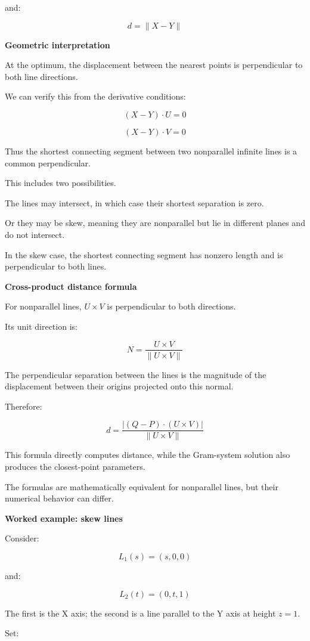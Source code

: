 and:

\[
\boxed{d=\|X-Y\|}
\]

\textbf{Geometric interpretation}

At the optimum, the displacement between the nearest points is perpendicular to both line directions.

We can verify this from the derivative conditions:

\[
(X-Y)\cdot U=0
\]

\[
(X-Y)\cdot V=0
\]

Thus the shortest connecting segment between two nonparallel infinite lines is a common perpendicular.

This includes two possibilities.

The lines may intersect, in which case their shortest separation is zero.

Or they may be skew, meaning they are nonparallel but lie in different planes and do not intersect.

In the skew case, the shortest connecting segment has nonzero length and is perpendicular to both lines.

\textbf{Cross-product distance formula}

For nonparallel lines, \(U\times V\) is perpendicular to both directions.

Its unit direction is:

\[
N=\frac{U\times V}{\|U\times V\|}
\]

The perpendicular separation between the lines is the magnitude of the displacement between their origins projected onto this normal.

Therefore:

\[
\boxed{ d= \frac{|(Q-P)\cdot(U\times V)|} {\|U\times V\|} }
\]

This formula directly computes distance, while the Gram-system solution also produces the closest-point parameters.

The formulas are mathematically equivalent for nonparallel lines, but their numerical behavior can differ.

\textbf{Worked example: skew lines}

Consider:

\[
L_1(s)=(s,0,0)
\]

and:

\[
L_2(t)=(0,t,1)
\]

The first is the X axis; the second is a line parallel to the Y axis at height \(z=1\).

Set:

